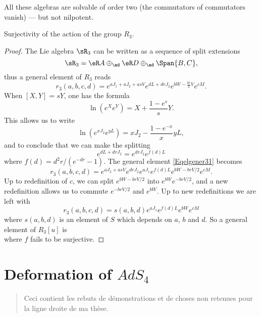 \let\ANCtheenumi\theenumi
All these algebras are solvable of order two (the commutators of commutators vanish) --- but not nilpotent.

\begin{proposition}
Surjectivity of the action of the group $R_3$.
\end{proposition}

\begin{proof}
The Lie algebra $\sR_3$ can be written as a sequence of split extensions
\[ 
  \sR_3=\eR A\oplus_{\ad}\eR D\oplus_{\ad}\Span\{ B,C \},
\]
thus a general element of $R_3$ reads
\begin{equation}  \label{Eqelgener31}
r_3(a,b,c,d)= e^{aJ_1+aJ_2+asV} e^{dL+drJ_2} e^{bW-\frac{ br }{2}V} e^{cM}.
\end {equation}
When $[X,Y]=sY$, one has the formula
\begin{equation}
 \ln(e^{X} e^{Y})=X+\frac{ 1- e^{s} }{ s }Y.
\end{equation}
This allows us to write
\[ 
  \ln( e^{xJ_2} e^{yL})= xJ_2-\frac{ 1- e^{-x} }{ x }yL,
\]
and to conclude that we can make the splitting
\[ 
   e^{dL+drJ_2}= e^{drJ_2} e^{f(d)L}
\]
where $f(d)=d^{2}r/( e^{-dr}-1)$. The general element \eqref{Eqelgener31} becomes
\[ 
  r_3(a,b,c,d)= e^{aJ_2+asV} e^{drJ_2} e^{aJ_1} e^{f(d)L} e^{bW-brV/2} e^{cM}.
\]
Up to redefinition of $c$, we can split $ e^{bW-brV/2}$ into $ e^{bW} e^{-brV/2}$, and a new redefinition allows us to commute $ e^{-brV/2}$ and $ e^{bW}$. Up to new redefinitions we are left with
\[ 
  r_3(a,b,c,d)=s(a,b,d) e^{aJ_1} e^{f(d)L} e^{bW} e^{cM}
\]
where $s(a,b,d)$ is an element of $S$ which depends on $a$, $b$ and $d$. So a general element of $R_3[u]$ is
\begin{equation}
  [ e^{cM} e^{bW} e^{-f(d)L} e^{aJ_1}u]
\end{equation}
where $f$ fails to be surjective.
\end{proof}

%
   \section{Deformation of \texorpdfstring{$AdS_4$}{AdS4}}
%


\begin{abstract}
Ceci contient les rebuts de démonstrations et de choses non retenues pour la ligne droite de ma thèse.
\end{abstract}

